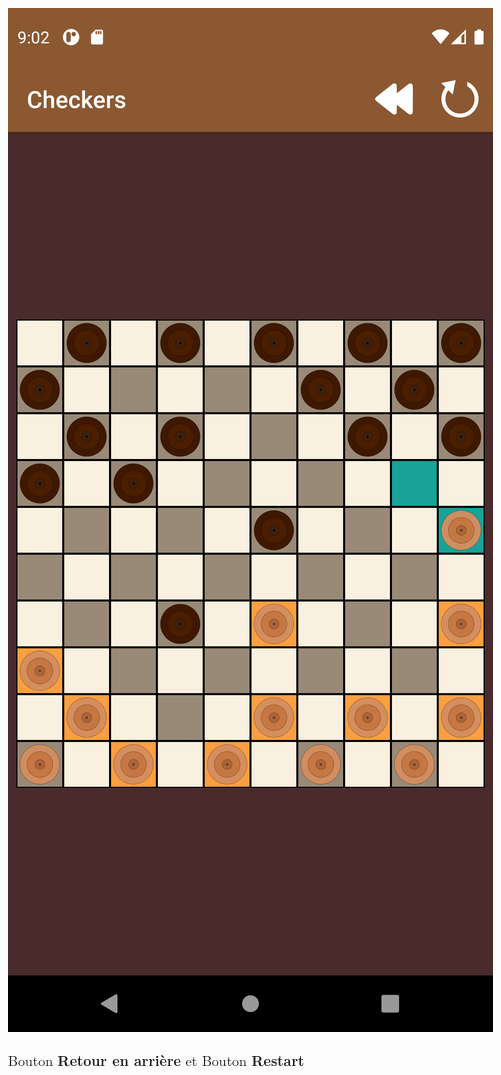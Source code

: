\documentclass{beamer}
\begin{document}
\begin{frame}
\begin{center}
    \includegraphics[scale=0.05]{partie_2.png}
    \begin{center}
      Bouton \textbf{Retour en arrière} et Bouton \textbf{Restart}
    \end{center}
  \end{center}

\end{frame}
\end{document}

